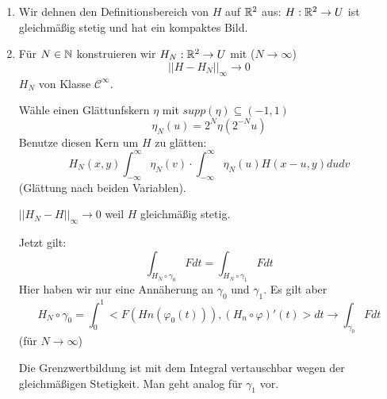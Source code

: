 \documentclass[main.tex]{subfiles}
\begin{document}
\begin{Beweis}
  \begin{enumerate}
    \item Wir dehnen den Definitionsbereich von $H$ auf $\mathbb{R}^2$ aus: $H: \mathbb{R}^2 \to U$ ist gleichmäßig stetig und hat ein kompaktes Bild.
    \item Für $N \in \mathbb{N}$ konstruieren wir $H_N: \mathbb{R}^2 \to U$ mit ($N \to \infty$)
    $$||H - H_N||_\infty \longrightarrow 0$$
    $H_N$ von Klasse $\mathcal{C}^\infty$.

    Wähle einen Glättunfskern $\eta$ mit $supp(\eta) \subseteq (-1,1)$
    $$\eta_N(u) = 2^N \eta(2^{-N} u)$$
    Benutze diesen Kern um $H$ zu glätten:
    $$H_N(x,y) \int_{-\infty}^\infty \eta_N(v) \cdot \int_{-\infty}^\infty \eta_N(u)H(x-u,y)du dv$$
    (Glättung nach beiden Variablen).

    $||H_N - H||_\infty \to 0$ weil $H$ gleichmäßig stetig.

    Jetzt gilt:
    $$\int_{H_N \circ \gamma_0} F dt = \int_{H_N \circ \gamma_1} F dt$$
    Hier haben wir nur eine Annäherung an $\gamma_0$ und $\gamma_1$. Es gilt aber
    $$H_N \circ \gamma_0 = \int_0^1 <F(Hn(\varphi_0(t))),(H_n \circ \varphi)'(t)> dt \longrightarrow \int_{\gamma_0} F dt$$
    (für $N \to \infty$)
    
    Die Grenzwertbildung ist mit dem Integral vertauschbar wegen der gleichmäßigen Stetigkeit. Man geht analog für $\gamma_1$ vor.
  \end{enumerate}
\end{Beweis}
\end{document}
